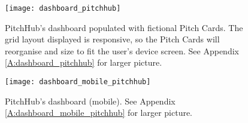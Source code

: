 \begin{figure}[ht]
    \centering
    \texttt{[image: dashboard\_pitchhub]}
    \caption{PitchHub's dashboard populated with fictional Pitch Cards. The grid layout displayed is responsive, so the Pitch Cards will reorganise and size to fit the user's device screen. See Appendix \ref{A:dashboard_pitchhub} for larger picture.}
    \label{fig:dashboard_pitchhub}
\end{figure}

\begin{figure}[ht]
    \centering
    \texttt{[image: dashboard\_mobile\_pitchhub]}
    \caption{PitchHub's dashboard (mobile). See Appendix \ref{A:dashboard_mobile_pitchhub} for larger picture.}
    \label{fig:dashboard_mobile_pitchhub}
\end{figure}